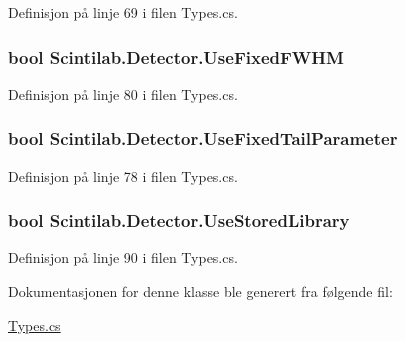 Definisjon på linje 69 i filen Types.\+cs.

\hypertarget{class_scintilab_1_1_detector_a291b690d9f2ec1266fad776c5418bf08}{
\subsubsection[{Use\+Fixed\+F\+W\+H\+M}]{\setlength{\rightskip}{0pt plus 5cm}bool Scintilab.\+Detector.\+Use\+Fixed\+F\+W\+H\+M}}\label{class_scintilab_1_1_detector_a291b690d9f2ec1266fad776c5418bf08}


Definisjon på linje 80 i filen Types.\+cs.

\hypertarget{class_scintilab_1_1_detector_a2c25fcf9cf3fdab6e7cba6b76775d322}{
\subsubsection[{Use\+Fixed\+Tail\+Parameter}]{\setlength{\rightskip}{0pt plus 5cm}bool Scintilab.\+Detector.\+Use\+Fixed\+Tail\+Parameter}}\label{class_scintilab_1_1_detector_a2c25fcf9cf3fdab6e7cba6b76775d322}


Definisjon på linje 78 i filen Types.\+cs.

\hypertarget{class_scintilab_1_1_detector_a190207abf3f03edb5868c178c3957a29}{
\subsubsection[{Use\+Stored\+Library}]{\setlength{\rightskip}{0pt plus 5cm}bool Scintilab.\+Detector.\+Use\+Stored\+Library}}\label{class_scintilab_1_1_detector_a190207abf3f03edb5868c178c3957a29}


Definisjon på linje 90 i filen Types.\+cs.



Dokumentasjonen for denne klasse ble generert fra følgende fil\+:\begin{DoxyCompactItemize}
\item 
\hyperlink{_types_8cs}{Types.\+cs}\end{DoxyCompactItemize}
